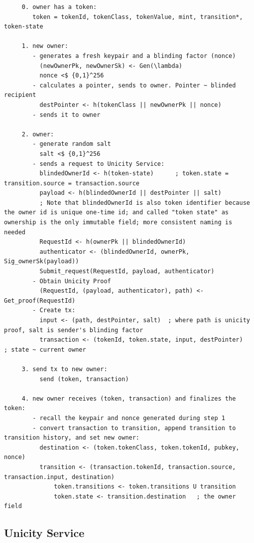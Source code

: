 \begin{lstlisting}
     0. owner has a token:
        token = tokenId, tokenClass, tokenValue, mint, transition*, token-state

     1. new owner:
        - generates a fresh keypair and a blinding factor (nonce)
          (newOwnerPk, newOwnerSk) <- Gen(\lambda)
          nonce <$ {0,1}^256
        - calculates a pointer, sends to owner. Pointer ~ blinded recipient
          destPointer <- h(tokenClass || newOwnerPk || nonce)
        - sends it to owner

     2. owner:
        - generate random salt
          salt <$ {0,1}^256
        - sends a request to Unicity Service:
          blindedOwnerId <- h(token-state)      ; token.state = transition.source = transaction.source
          payload <- h(blindedOwnerId || destPointer || salt)
          ; Note that blindedOwnerId is also token identifier because the owner id is unique one-time id; and called "token state" as ownership is the only immutable field; more consistent naming is needed
          RequestId <- h(ownerPk || blindedOwnerId)
          authenticator <- (blindedOwnerId, ownerPk, Sig_ownerSk(payload))
          Submit_request(RequestId, payload, authenticator)
        - Obtain Unicity Proof
          (RequestId, (payload, authenticator), path) <- Get_proof(RequestId)
        - Create tx:
          input <- (path, destPointer, salt)  ; where path is unicity proof, salt is sender's blinding factor
          transaction <- (tokenId, token.state, input, destPointer)   ; state ~ current owner

     3. send tx to new owner:
          send (token, transaction)

     4. new owner receives (token, transaction) and finalizes the token:
        - recall the keypair and nonce generated during step 1
        - convert transaction to transition, append transition to transition history, and set new owner:
          destination <- (token.tokenClass, token.tokenId, pubkey, nonce)
          transition <- (transaction.tokenId, transaction.source, transaction.input, destination)
              token.transitions <- token.transitions U transition
              token.state <- transition.destination   ; the owner field

\end{lstlisting}

\subsection{Unicity Service}

